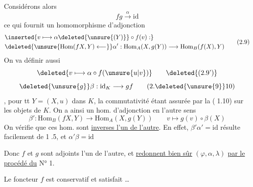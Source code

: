 Considérons alors
\[
 fg\xrightarrow{\alpha}\mathrm{id} \tag*{(2.8)}
\]
ce qui fournit un homomorphisme d'adjonction
\[
 \begin{aligned}
 &\inserted{v\longmapsto\alpha\deleted{\unsure{(Y)}}\circ f(v):}\\
 &\deleted{\unsure{\mathrm{Hom}(fX,Y)\longleftarrow}}\alpha':\mathrm{Hom}_A(X,g(Y))\longrightarrow\mathrm{Hom}_B(f(X),Y)
 \end{aligned} \tag*{(2.9)}
\]
 On va définir aussi
\[
 \deleted{v\longmapsto\alpha\circ f(\unsure{u|v})} \tag*{\deleted{(2.9')}}
\]
\[
 \deleted{\unsure{g}}\beta:\mathrm{id}_K\longrightarrow gf \tag*{(2.\deleted{\unsure{9}}10)}
\]
 , pour tt $Y=(X,u)$ dans $K$,
la commutativité étant assurée par la  \textcircled{\scriptsize (1.10)} sur les objets de $K$. On a ainsi un hom. d'adjonction en l'autre sens
\[
 \beta':\mathrm{Hom}_B(fX,Y)\longrightarrow\mathrm{Hom}_A(X,g(Y))
 \qquad v\longmapsto g(v)\circ\beta(X) \tag*{(2.11)}
\]
On vérifie que ces hom. sont \uline{inverses l'un de l'autre}. En effet, $\beta'\alpha'=\mathrm{id}$ résulte facilement de \textcircled{\scriptsize 1.5}, et $\alpha'\beta=\mathrm{id}$ 

Donc $f$ et $g$ sont adjoints l'un de l'autre, et \uline{redonnent bien sûr}  $(\varphi,\alpha,\lambda)$ \uline{par le procédé du} N° 1.

Le foncteur $f$ est conservatif et satisfait  \ldots
